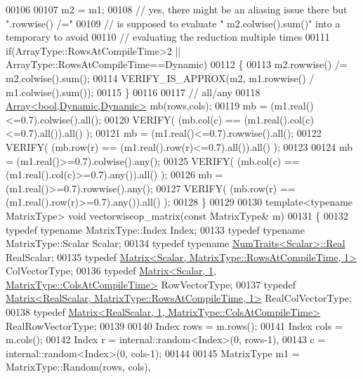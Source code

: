 \begin{DoxyCode}
00106 
00107   m2 = m1;
00108   \textcolor{comment}{// yes, there might be an aliasing issue there but ".rowwise() /="}
00109   \textcolor{comment}{// is supposed to evaluate " m2.colwise().sum()" into a temporary to avoid}
00110   \textcolor{comment}{// evaluating the reduction multiple times}
00111   \textcolor{keywordflow}{if}(ArrayType::RowsAtCompileTime>2 || ArrayType::RowsAtCompileTime==Dynamic)
00112   \{
00113     m2.rowwise() /= m2.colwise().sum();
00114     VERIFY\_IS\_APPROX(m2, m1.rowwise() / m1.colwise().sum());
00115   \}
00116 
00117   \textcolor{comment}{// all/any}
00118   \hyperlink{group___core___module_class_eigen_1_1_array}{Array<bool,Dynamic,Dynamic>} mb(rows,cols);
00119   mb = (m1.real()<=0.7).colwise().all();
00120   VERIFY( (mb.col(c) == (m1.real().col(c)<=0.7).all()).all() );
00121   mb = (m1.real()<=0.7).rowwise().all();
00122   VERIFY( (mb.row(r) == (m1.real().row(r)<=0.7).all()).all() );
00123 
00124   mb = (m1.real()>=0.7).colwise().any();
00125   VERIFY( (mb.col(c) == (m1.real().col(c)>=0.7).any()).all() );
00126   mb = (m1.real()>=0.7).rowwise().any();
00127   VERIFY( (mb.row(r) == (m1.real().row(r)>=0.7).any()).all() );
00128 \}
00129 
00130 \textcolor{keyword}{template}<\textcolor{keyword}{typename} MatrixType> \textcolor{keywordtype}{void} vectorwiseop\_matrix(\textcolor{keyword}{const} MatrixType& m)
00131 \{
00132   \textcolor{keyword}{typedef} \textcolor{keyword}{typename} MatrixType::Index Index;
00133   \textcolor{keyword}{typedef} \textcolor{keyword}{typename} MatrixType::Scalar Scalar;
00134   \textcolor{keyword}{typedef} \textcolor{keyword}{typename} \hyperlink{group___core___module_struct_eigen_1_1_num_traits}{NumTraits<Scalar>::Real} RealScalar;
00135   \textcolor{keyword}{typedef} \hyperlink{group___core___module_class_eigen_1_1_matrix}{Matrix<Scalar, MatrixType::RowsAtCompileTime, 1>} 
      ColVectorType;
00136   \textcolor{keyword}{typedef} \hyperlink{group___core___module_class_eigen_1_1_matrix}{Matrix<Scalar, 1, MatrixType::ColsAtCompileTime>} 
      RowVectorType;
00137   \textcolor{keyword}{typedef} \hyperlink{group___core___module_class_eigen_1_1_matrix}{Matrix<RealScalar, MatrixType::RowsAtCompileTime, 1>}
       RealColVectorType;
00138   \textcolor{keyword}{typedef} \hyperlink{group___core___module_class_eigen_1_1_matrix}{Matrix<RealScalar, 1, MatrixType::ColsAtCompileTime>}
       RealRowVectorType;
00139 
00140   Index rows = m.rows();
00141   Index cols = m.cols();
00142   Index r = internal::random<Index>(0, rows-1),
00143         c = internal::random<Index>(0, cols-1);
00144 
00145   MatrixType m1 = MatrixType::Random(rows, cols),

\end{DoxyCode}

